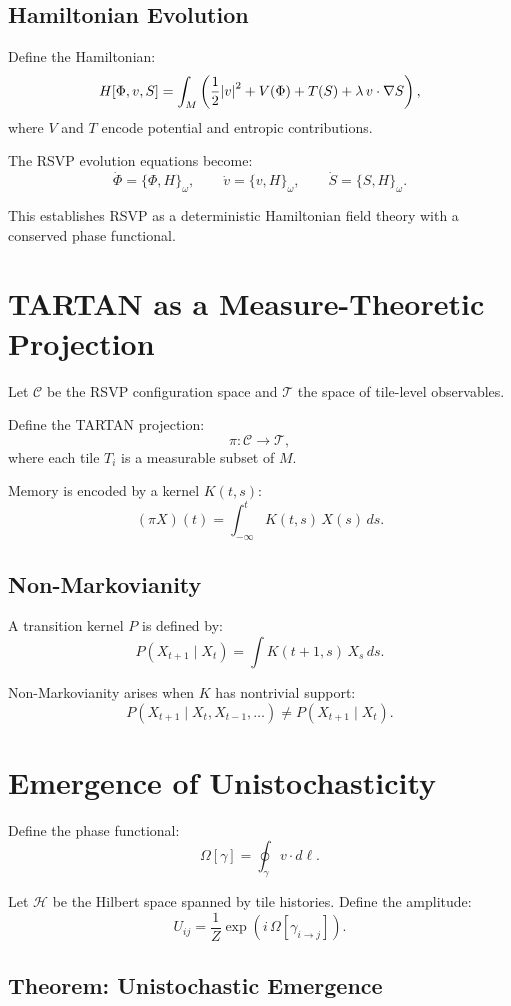 \documentclass[11pt]{article}
\begin{document}
\subsection{Hamiltonian Evolution}

Define the Hamiltonian:
\[
H[\Phi, v, S] = \int_M \left(
\frac{1}{2}\abs{v}^2 + V(\Phi) + T(S) + \lambda\, v\cdot\nabla S
\right),
\]
where $V$ and $T$ encode potential and entropic contributions.

The RSVP evolution equations become:
\[
\dot{\Phi} = \{\Phi, H\}_\omega, \qquad
\dot{v} = \{v, H\}_\omega, \qquad
\dot{S} = \{S, H\}_\omega.
\]

This establishes RSVP as a deterministic Hamiltonian field theory with a
conserved phase functional.

\section{TARTAN as a Measure-Theoretic Projection}

Let $\mathcal{C}$ be the RSVP configuration space and $\mathcal{T}$ the space
of tile-level observables.

Define the TARTAN projection:
\[
\pi : \mathcal{C} \to \mathcal{T},
\]
where each tile $T_i$ is a measurable subset of $M$.

Memory is encoded by a kernel $K(t,s)$:
\[
(\pi X)(t) = \int_{-\infty}^t K(t,s)\, X(s)\, ds.
\]

\subsection{Non-Markovianity}

A transition kernel $P$ is defined by:
\[
P(X_{t+1} \mid X_t) = \int K(t+1,s)\, X_s\, ds.
\]

Non-Markovianity arises when $K$ has nontrivial support:
\[
P(X_{t+1} \mid X_t, X_{t-1}, \dots) \neq P(X_{t+1} \mid X_t).
\]

\section{Emergence of Unistochasticity}

Define the phase functional:
\[
\Omega[\gamma] = \oint_\gamma v\cdot d\ell.
\]

Let $\mathcal{H}$ be the Hilbert space spanned by tile histories. Define the
amplitude:
\[
U_{ij} = \frac{1}{Z} \exp(i\,\Omega[\gamma_{i\to j}]).
\]

\subsection{Theorem: Unistochastic Emergence}
\end{document}
